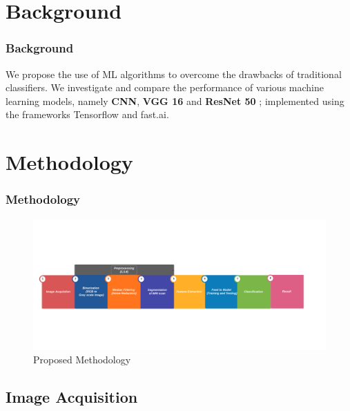 \documentclass[10pt, aspectratio=169]{beamer}
\begin{document}
	\section{Background}

	\begin{frame}
		\frametitle{Background}

		We propose the use of ML algorithms to overcome the drawbacks of
		traditional classifiers. We investigate and compare the performance of
		various machine learning models, namely \textbf{CNN}, \textbf{VGG 16}
		and \textbf{ ResNet 50 }; implemented using the frameworks Tensorflow
		and fast.ai.
	\end{frame}

	\section{Methodology}

	\begin{frame}
		\frametitle{Methodology}

		\vspace{-1cm}

		\begin{figure}[h]
			\centering
			\includegraphics[width=\textwidth]{imgs/flowchart}
			\caption{Proposed Methodology}%
			\label{fig:prop_methodology}
		\end{figure}

	\end{frame}

	\subsection{Image Acquisition}
\end{document}
